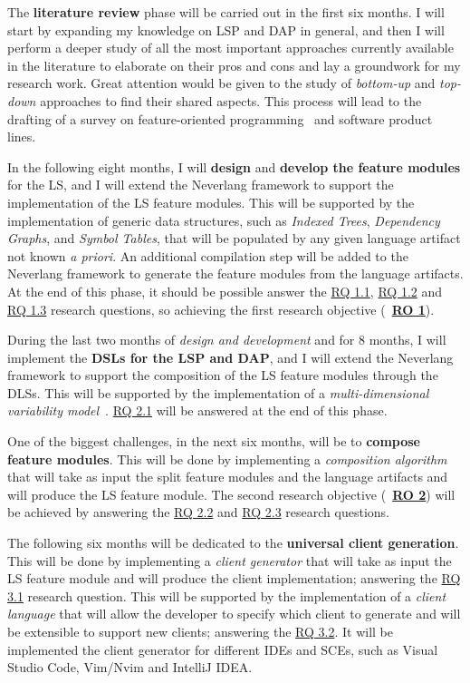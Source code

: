 The \textbf{literature review} phase will be carried out in the first six months. I will start by expanding my knowledge on LSP and DAP in general, and then I will perform a deeper study of all the most important approaches currently available in the literature to elaborate on their pros and cons and lay a groundwork for my research work. Great attention would be given to the study of \textit{bottom-up} and \textit{top-down} approaches to find their shared aspects. This process will lead to the drafting of a survey on feature-oriented programming~\cite{Prehofer97} and software product lines.

In the following eight months, I will \textbf{design} and \textbf{develop the feature modules} for the LS, and I will extend the Neverlang framework to support the implementation of the LS feature modules. This will be supported by the implementation of generic data structures, such as \textit{Indexed Trees}, \textit{Dependency Graphs}, and \textit{Symbol Tables}, that will be populated by any given language artifact not known \textit{a priori}. An additional compilation step will be added to the Neverlang framework to generate the feature modules from the language artifacts. At the end of this phase, it should be possible answer the \hyperlink{rq11}{\textsf{RQ 1.1}}, \hyperlink{rq12}{\textsf{RQ 1.2}} and \hyperlink{rq13}{\textsf{RQ 1.3}} research questions, so achieving the first research objective (~\hyperlink{ro1}{\textbf{RO 1}}).

During the last two months of \textit{design and development} and for 8 months, I will implement the \textbf{DSLs for the LSP and DAP}, and I will extend the Neverlang framework to support the composition of the LS feature modules through the DLSs. This will be supported by the implementation of a \textit{multi-dimensional variability model}~\cite{Rosenmuller11}. \hyperlink{rq21}{\textsf{RQ 2.1}} will be answered at the end of this phase.

One of the biggest challenges, in the next six months, will be to \textbf{compose feature modules}. This will be done by implementing a \textit{composition algorithm} that will take as input the split feature modules and the language artifacts and will produce the LS feature module. The second research objective (~\hyperlink{ro2}{\textbf{RO 2}}) will be achieved by answering the \hyperlink{rq22}{\textsf{RQ 2.2}} and \hyperlink{rq23}{\textsf{RQ 2.3}} research questions.

The following six months will be dedicated to the \textbf{universal client generation}. This will be done by implementing a \textit{client generator} that will take as input the LS feature module and will produce the client implementation; answering the \hyperlink{rq31}{\textsf{RQ 3.1}} research question. This will be supported by the implementation of a \textit{client language} that will allow the developer to specify which client to generate and will be extensible to support new clients; answering the \hyperlink{rq31}{\textsf{RQ 3.2}}. It will be implemented the client generator for different IDEs and SCEs, such as Visual Studio Code, Vim/Nvim and IntelliJ IDEA.

